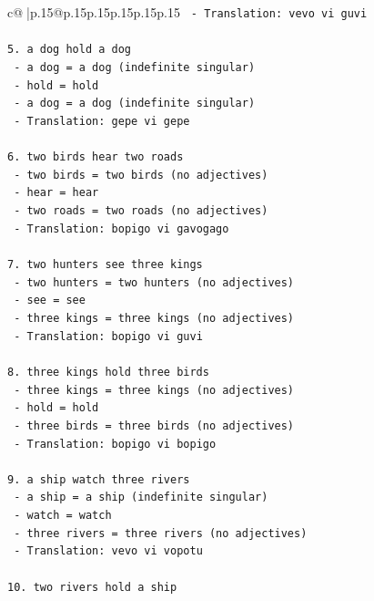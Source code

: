 \documentclass{article}
\begin{document}
{\begin{supertabular}{c@{$\;$}|p{.15\linewidth}@{}p{.15\linewidth}p{.15\linewidth}p{.15\linewidth}p{.15\linewidth}p{.15\linewidth}}
{{{\texttt{   {-} Translation: vevo vi guvi} \\
\\ 
\texttt{5. a dog hold a dog} \\
\texttt{   {-} a dog = a dog (indefinite singular)} \\
\texttt{   {-} hold = hold} \\
\texttt{   {-} a dog = a dog (indefinite singular)} \\
\texttt{   {-} Translation: gepe vi gepe} \\
\\ 
\texttt{6. two birds hear two roads} \\
\texttt{   {-} two birds = two birds (no adjectives)} \\
\texttt{   {-} hear = hear} \\
\texttt{   {-} two roads = two roads (no adjectives)} \\
\texttt{   {-} Translation: bopigo vi gavogago} \\
\\ 
\texttt{7. two hunters see three kings} \\
\texttt{   {-} two hunters = two hunters (no adjectives)} \\
\texttt{   {-} see = see} \\
\texttt{   {-} three kings = three kings (no adjectives)} \\
\texttt{   {-} Translation: bopigo vi guvi} \\
\\ 
\texttt{8. three kings hold three birds} \\
\texttt{   {-} three kings = three kings (no adjectives)} \\
\texttt{   {-} hold = hold} \\
\texttt{   {-} three birds = three birds (no adjectives)} \\
\texttt{   {-} Translation: bopigo vi bopigo} \\
\\ 
\texttt{9. a ship watch three rivers} \\
\texttt{   {-} a ship = a ship (indefinite singular)} \\
\texttt{   {-} watch = watch} \\
\texttt{   {-} three rivers = three rivers (no adjectives)} \\
\texttt{   {-} Translation: vevo vi vopotu} \\
\\ 
\texttt{10. two rivers hold a ship} \\
}}}
\end{supertabular}}
\end{document}
